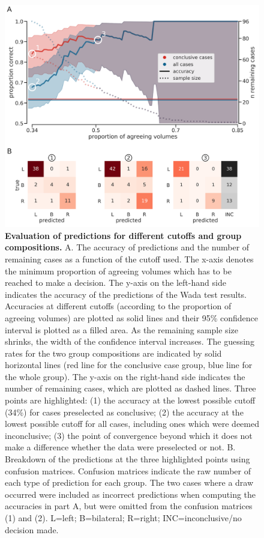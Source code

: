 \documentclass[fleqn,10pt]{SelfArx} %
\begin{document}
\begin{figure}[htbp]
	\begin{minipage}{\textwidth}
		\renewcommand{\familydefault}{\sfdefault}\normalfont
		\centering
		\includegraphics[width=0.95\columnwidth]{../reports/figures/13-curve-and-cm-together.png}
		\caption{\textbf{Evaluation of predictions for different cutoffs and group compositions.} 
			A. The accuracy of predictions and the number of remaining cases as a function of the cutoff used. The x-axis denotes the minimum proportion of agreeing volumes which has to be reached to make a decision. The y-axis on the left-hand side indicates the accuracy of the predictions of the Wada test results. Accuracies at different cutoffs (according to the proportion of agreeing volumes) are plotted as solid lines and their 95\% confidence interval is plotted as a filled area. As the remaining sample size shrinks, the width of the confidence interval increases. The guessing rates for the two group compositions are indicated by solid horizontal lines (red line for the conclusive case group, blue line for the whole group). The y-axis on the right-hand side indicates the number of remaining cases, which are plotted as dashed lines. Three points are highlighted: (1) the accuracy at the lowest possible cutoff (34\%) for cases preselected as conclusive; (2) the accuracy at the lowest possible cutoff for all cases, including ones which were deemed inconclusive; (3) the point of convergence beyond which it does not make a difference whether the data were preselected or not.
			B. Breakdown of the predictions at the three highlighted points using confusion matrices. Confusion matrices indicate the raw number of each type of prediction for each group. The two cases where a draw occurred were included as incorrect predictions when computing the accuracies in part A, but were omitted from the confusion matrices (1) and (2). L=left; B=bilateral; R=right; INC=inconclusive/no decision made.}%
		\label{fig:eval}
	\end{minipage}
\end{figure}
\end{document}
